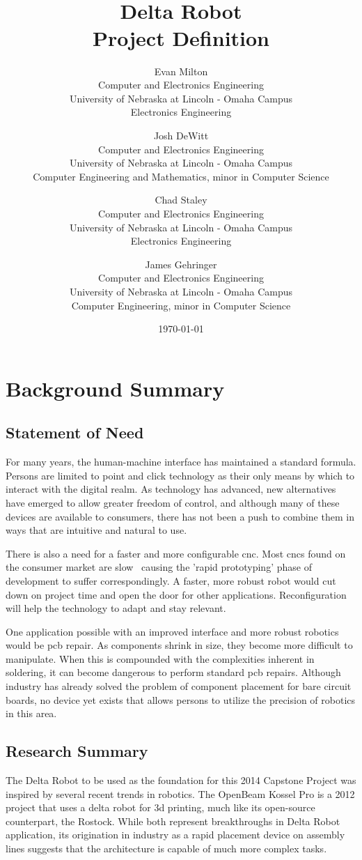 \documentclass[11pt]{report}
\title{\thickline \\ \novspace \thinline \\ \TitleFont Delta Robot \\ Project Definition \thinline \\ \novspace \thickline}
\author{
	Evan Milton \\
	Computer and Electronics Engineering \\
	University of Nebraska at Lincoln - Omaha Campus \\
	Electronics Engineering
		\and
	Josh DeWitt \\
	Computer and Electronics Engineering \\
	University of Nebraska at Lincoln - Omaha Campus \\
	Computer Engineering and Mathematics, minor in Computer Science
		\and
	Chad Staley \\
	Computer and Electronics Engineering \\
	University of Nebraska at Lincoln - Omaha Campus \\
	Electronics Engineering
		\and
	James Gehringer \\
	Computer and Electronics Engineering \\
	University of Nebraska at Lincoln - Omaha Campus \\
	Computer Engineering, minor in Computer Science
}
\date{\today}
\begin{document}
\maketitle

\tableofcontents

\listoffigures
\begingroup
\let\clearpage\relax
\listoftables
\endgroup

\chapter{Background Summary}
\section{Statement of Need}
For many years, the human-machine interface has maintained a standard formula.
Persons are limited to point and click technology as their only means by which to interact with the digital realm.
As technology has advanced, new alternatives have emerged to allow  greater freedom of control, and although many of these devices are available to consumers, there has not been a push to combine them in ways that are intuitive and natural to use.

There is also a need for a faster and more configurable \gls{cnc}.
Most \gls{cnc}s found on the consumer market are slow~ causing the 'rapid prototyping' phase of development to suffer correspondingly.
A faster, more robust robot would cut down on project time and open the door for other applications.
Reconfiguration will help the technology to adapt and stay relevant.

One application possible with an improved interface and more robust robotics would be \gls{pcb} repair.
As components shrink in size, they become more difficult to manipulate.
When this is compounded with the complexities inherent in soldering, it can become dangerous to perform standard \gls{pcb} repairs.
Although industry has already solved the problem of component placement for bare circuit boards, no device yet exists that allows persons to utilize the precision of robotics in this area. 

\section{Research Summary}
The Delta Robot to be used as the foundation for this 2014 Capstone Project was inspired by several recent trends in robotics.
The OpenBeam Kossel Pro is a 2012 project that uses a delta robot for \gls{3d} printing, much like its open-source counterpart, the Rostock.
While both represent breakthroughs in Delta Robot application, its origination in industry as a rapid placement device on assembly lines suggests that the architecture is capable of much more complex tasks.
\end{document}
